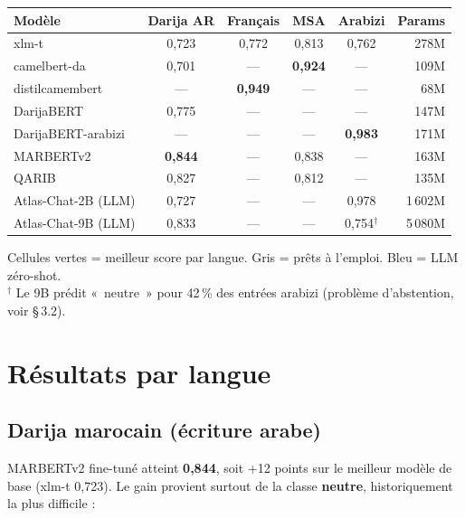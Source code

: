 \documentclass[11pt, a4paper]{article}
\begin{document}
\vspace{4pt}
\begin{center}
\setlength{\tabcolsep}{7pt}
\begin{tabular}{lccccr}
\toprule
\textbf{Modèle} & \textbf{Darija AR} & \textbf{Français} & \textbf{MSA} & \textbf{Arabizi} & \textbf{Params} \\
\midrule
\rowcolor{gray!12} xlm-t            & 0{,}723 & 0{,}772 & 0{,}813 & 0{,}762 & 278M \\
\rowcolor{gray!12} camelbert-da     & 0{,}701 & —       & \cellcolor{goodgreen!25}\textbf{0{,}924} & — & 109M \\
\rowcolor{gray!12} distilcamembert  & —       & \cellcolor{goodgreen!25}\textbf{0{,}949} & — & — & 68M \\
\midrule
DarijaBERT       & 0{,}775 & — & — & — & 147M \\
DarijaBERT-arabizi & —     & — & — & \cellcolor{goodgreen!25}\textbf{0{,}983} & 171M \\
MARBERTv2        & \cellcolor{goodgreen!25}\textbf{0{,}844} & — & 0{,}838 & — & 163M \\
QARIB            & 0{,}827 & — & 0{,}812 & — & 135M \\
\midrule
\rowcolor{llmblue} Atlas-Chat-2B (LLM) & 0{,}727 & — & — & 0{,}978 & 1\,602M \\
\rowcolor{llmblue} Atlas-Chat-9B (LLM) & 0{,}833 & — & — & 0{,}754$^\dagger$ & 5\,080M \\
\bottomrule
\end{tabular}
\end{center}

\vspace{2pt}
{\small Cellules vertes = meilleur score par langue. Gris = prêts à l'emploi. Bleu = LLM zéro-shot.\\
$^\dagger$ Le 9B prédit «~neutre~» pour 42\,\% des entrées arabizi (problème d'abstention, voir §\,3.2).}

\section{Résultats par langue}

\subsection{Darija marocain (écriture arabe)}

MARBERTv2 fine-tuné atteint \textbf{0{,}844}, soit +12 points sur le meilleur
modèle de base (xlm-t 0{,}723). Le gain provient surtout de la classe
\textbf{neutre}, historiquement la plus difficile :
\end{document}

